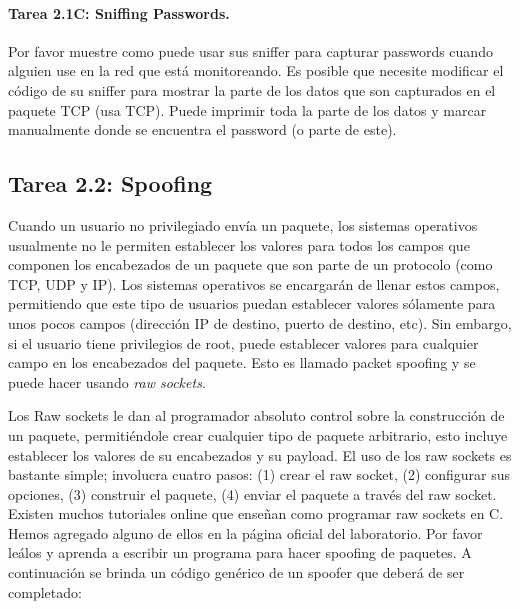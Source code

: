 \paragraph{Tarea 2.1C: Sniffing Passwords.}
Por favor muestre como puede usar sus sniffer para capturar passwords cuando alguien use \telnet en la red que está monitoreando. Es posible que necesite modificar el código de su sniffer para mostrar la parte de los datos que son capturados en el paquete TCP (\telnet usa TCP). Puede imprimir toda la parte de los datos y marcar manualmente donde se encuentra el password (o parte de este).

\subsection{Tarea 2.2: Spoofing}

Cuando un usuario no privilegiado envía un paquete, los sistemas operativos usualmente no le permiten establecer los valores para todos los campos que componen los encabezados de un paquete que son parte de un protocolo (como TCP, UDP y IP). Los sistemas operativos se encargarán de llenar estos campos, permitiendo que este tipo de usuarios puedan establecer valores sólamente para unos pocos campos (dirección IP de destino, puerto de destino, etc). Sin embargo, si el usuario tiene privilegios de root, puede establecer valores para cualquier campo en los encabezados del paquete. Esto es llamado packet spoofing y se puede hacer usando {\em raw sockets}. 


Los Raw sockets le dan al programador absoluto control sobre la construcción de un paquete, permitiéndole crear cualquier tipo de paquete arbitrario, esto incluye establecer los valores de su encabezados y su payload. El uso de los raw sockets es bastante simple; involucra cuatro pasos: (1) crear el raw socket, (2) configurar sus opciones, (3) construir el paquete, (4) enviar el paquete a través del raw socket. Existen muchos tutoriales online que enseñan como programar raw sockets en C. Hemos agregado alguno de ellos en la página oficial del laboratorio. Por favor leálos y aprenda a escribir un programa para hacer spoofing de paquetes. A continuación se brinda un código genérico de un spoofer que deberá de ser completado:

